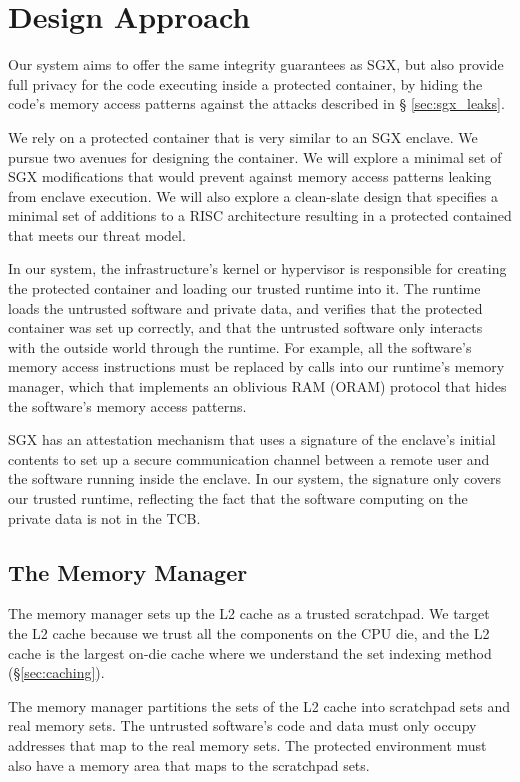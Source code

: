 \section{Design Approach}
\label{sec:design}

Our system aims to offer the same integrity guarantees as SGX, but also provide
full privacy for the code executing inside a protected container, by hiding the
code's memory access patterns against the attacks described in \S
\ref{sec:sgx_leaks}.

We rely on a protected container that is very similar to an SGX enclave. We
pursue two avenues for designing the container. We will explore a minimal set
of SGX modifications that would prevent against memory access patterns leaking
from enclave execution. We will also explore a clean-slate design that
specifies a minimal set of additions to a RISC architecture resulting in a
protected contained that meets our threat model.

In our system, the infrastructure's kernel or hypervisor is responsible for
creating the protected container and loading our trusted runtime into it. The
runtime loads the untrusted software and private data, and verifies that the
protected container was set up correctly, and that the untrusted software
only interacts with the outside world through the runtime. For example, all
the software's memory access instructions must be replaced by calls into our
runtime's memory manager, which that implements an oblivious RAM (ORAM)
protocol \cite{stefanov2013path} that hides the software's memory access
patterns.

SGX has an attestation mechanism that uses a signature of the enclave's initial
contents to set up a secure communication channel between a remote user and
the software running inside the enclave. In our system, the signature only
covers our trusted runtime, reflecting the fact that the software computing on
the private data is not in the TCB.


\subsection{The Memory Manager}

The memory manager sets up the L2 cache as a trusted scratchpad. We target the
L2 cache because we trust all the components on the CPU die, and the L2 cache
is the largest on-die cache where we understand the set indexing method
(\S \ref{sec:caching}).

The memory manager partitions the sets of the L2 cache into scratchpad sets and
real memory sets. The untrusted software's code and data must only occupy
addresses that map to the real memory sets. The protected environment must also
have a memory area that maps to the scratchpad sets.

